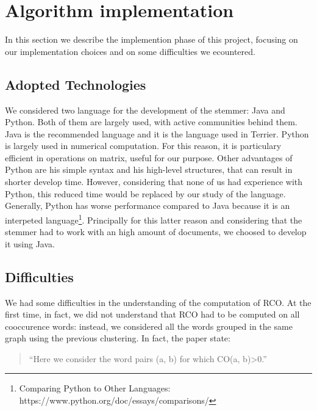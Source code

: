 \section{Algorithm implementation}
    In this section we describe the implemention phase of this project, focusing on our implementation choices and on some difficulties we ecountered.
    \subsection{Adopted Technologies}
        We considered two language for the development of the stemmer: Java and Python. Both of them are largely used, with active communities behind them. Java is the recommended language and it is the language used in Terrier. Python is largely used in numerical computation. For this reason, it is particulary efficient in operations on matrix, useful for our purpose. Other advantages of Python are his simple syntax and his high-level structures, that can result in shorter develop time. However, considering that none of us had experience with Python, this reduced time would be replaced by our study of the language. Generally, Python has worse performance compared to Java because it is an interpeted language\footnote{Comparing Python to Other Languages: https://www.python.org/doc/essays/comparisons/}. Principally for this latter reason and considering that the stemmer had to work with an high amount of documents, we choosed to develop it using Java.
    \subsection{Difficulties}
        We had some difficulties in the understanding of the computation of RCO. At the first time, in fact, we did not understand that RCO had to be computed on all cooccurence words: instead, we considered all the words grouped in the same graph using the previous clustering. In fact, the paper state:
        \begin{quotation}
            ``Here we consider the word pairs (a, b) for which CO(a, b)\textgreater 0.''
        \end{quotation}